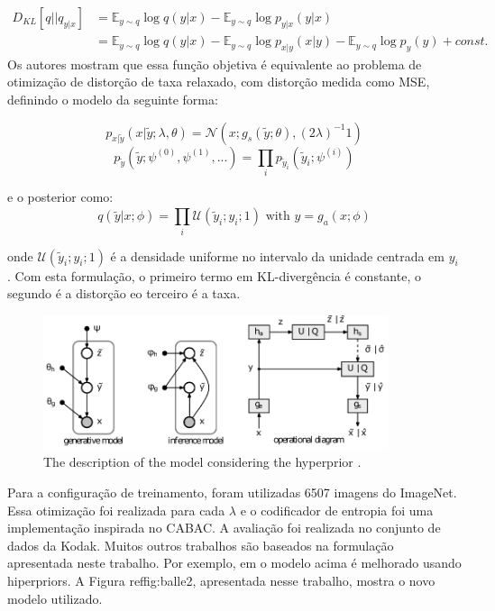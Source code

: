 \begin{equation}
\begin{aligned}
D_{KL} [q||q_{y|x}] &= \mathbb{E}_{y \sim q} \log q(y|x) - \mathbb{E}_{y \sim q} \log p_{y|x}(y|x) \\
&= \mathbb{E}_{y \sim q} \log q(y|x) - \mathbb{E}_{y \sim q} \log p_{x|y}(x|y) -  \mathbb{E}_{y \sim q} \log p_y(y) + const.
\end{aligned}
\end{equation}
Os autores mostram que essa função objetiva é equivalente ao problema de otimização de distorção de taxa relaxado, com distorção medida como MSE, definindo o modelo da seguinte forma:

\begin{equation}
p_{x|\tilde{y}}(x|\tilde{y};\lambda,\theta) = \mathcal{N}(x; g_s(\tilde{y}; \theta), (2\lambda)^{-1} 1)
\end{equation}
\begin{equation}
p_{\tilde{y}}(\tilde{y}; \psi^{(0)}, \psi^{(1)},...) = \prod_{i}^{} p_{\tilde{y}_i} (\tilde{y}_i; \psi^{(i)})
\end{equation}

e o posterior como:
\begin{equation}
q(\tilde{y}|x; \phi) = \prod_{i}^{} \mathcal{U}(\tilde{y}_i; y_i; 1) \text{ with } y = g_a(x; \phi)
\end{equation}

onde $\mathcal{U}(\tilde{y}_i; y_i; 1)$ é a densidade uniforme no intervalo da unidade centrada em $y_i$. Com esta formulação, o primeiro termo em KL-divergência é constante, o segundo é a distorção eo terceiro é a taxa.

\begin{figure}[ht]
	\centering
	\includegraphics[width=0.90\textwidth]{figuras/balle_2.pdf}
	\caption{The description of the model considering the hyperprior \cite{Variational2018Balle}.}
	\label{fig:balle2}
\end{figure}

Para a configuração de treinamento, foram utilizadas 6507 imagens do ImageNet. Essa otimização foi realizada para cada $\lambda$ e o codificador de entropia foi uma implementação inspirada no CABAC. A avaliação foi realizada no conjunto de dados da Kodak. Muitos outros trabalhos são baseados na formulação apresentada neste trabalho. Por exemplo, em \cite{Variational2018Balle} o modelo acima é melhorado usando hiperpriors. A Figura ref{fig:balle2}, apresentada nesse trabalho, mostra o novo modelo utilizado.

